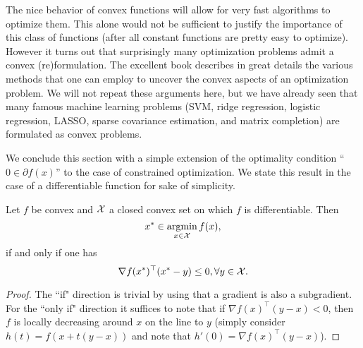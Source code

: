 The nice behavior of convex functions will allow for very fast algorithms to optimize them. This alone would not be sufficient to justify the importance of this class of functions (after all constant functions are pretty easy to optimize). However it turns out that surprisingly many optimization problems admit a convex (re)formulation. The excellent book \cite{BV04} describes in great details the various methods that one can employ to uncover the convex aspects of an optimization problem. We will not repeat these arguments here, but we have already seen that many famous machine learning problems (SVM, ridge regression, logistic regression, LASSO, sparse covariance estimation, and matrix completion) are formulated as convex problems.

We conclude this section with a simple extension of the optimality condition ``$0 \in \partial f(x)$'' to the case of constrained optimization. We state this result in the case of a differentiable function for sake of simplicity.
\begin{proposition} \label{prop:firstorder}
Let $f$ be convex and $\mathcal{X}$ a closed convex set on which $f$ is differentiable. Then
$$x^* \in \mathop{\mathrm{argmin}}_{x \in \mathcal{X}} f(x) ,$$
if and only if one has
$$\nabla f(x^*)^{\top}(x^*-y) \leq 0, \forall y \in \mathcal{X} .$$
\end{proposition}

\begin{proof}
The ``if" direction is trivial by using that a gradient is also a subgradient. For the ``only if" direction it suffices to note that if $\nabla f(x)^{\top} (y-x) < 0$, then $f$ is locally decreasing around $x$ on the line to $y$ (simply consider $h(t) = f(x + t (y-x))$ and note that $h'(0) = \nabla f(x)^{\top} (y-x)$).
\end{proof}


